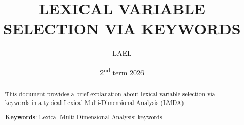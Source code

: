 \title{
    \LARGE \MakeUppercase{Lexical Variable Selection via Keywords}
}
\author{LAEL} %
\date{2\textsuperscript{nd} term 2026}
\maketitle
\begin{abstract}
    This document provides a brief explanation about lexical variable selection via keywords in a typical Lexical Multi-Dimensional Analysis (LMDA) \parencite{berbersardinhaLexicalMultiDimensionalAnalysis2025}

    \vspace{1em}
    \textbf{Keywords}: Lexical Multi-Dimensional Analysis; keywords
\end{abstract}

\listoffigures
\tableofcontents
